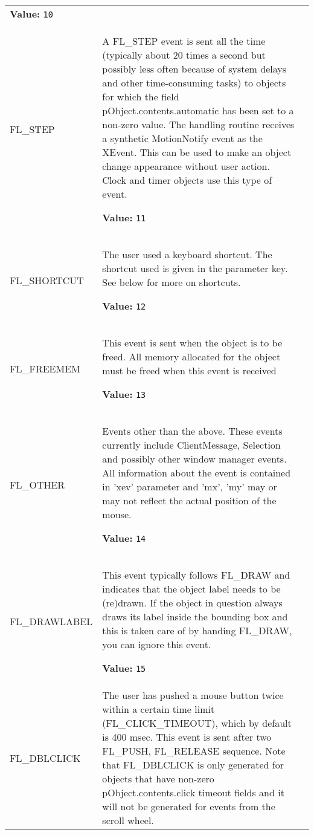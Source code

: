 \begin{longtable}{|p{\varnamewidth}|p{\vardescrwidth}|l}
\textbf{Value:} 
{\tt 10}&\\
\cline{1-2}
\raggedright F\-L\-\_\-S\-T\-E\-P\- & \raggedright A FL\_STEP event is sent all the time (typically about 20 times a
          second but possibly less often because of system delays and other
          time-consuming tasks) to objects for which the field 
          pObject.contents.automatic has been set to a non-zero value. The 
          handling routine receives a synthetic MotionNotify event as the 
          XEvent. This can be used to make an object change appearance 
          without user action. Clock and timer objects use this type of 
          event.

\textbf{Value:} 
{\tt 11}&\\
\cline{1-2}
\raggedright F\-L\-\_\-S\-H\-O\-R\-T\-C\-U\-T\- & \raggedright The user used a keyboard shortcut. The shortcut used is given in 
          the parameter key. See below for more on shortcuts.

\textbf{Value:} 
{\tt 12}&\\
\cline{1-2}
\raggedright F\-L\-\_\-F\-R\-E\-E\-M\-E\-M\- & \raggedright This event is sent when the object is to be freed. All memory 
          allocated for the object must be freed when this event is 
          received

\textbf{Value:} 
{\tt 13}&\\
\cline{1-2}
\raggedright F\-L\-\_\-O\-T\-H\-E\-R\- & \raggedright Events other than the above. These events currently include 
          ClientMessage, Selection and possibly other window manager 
          events. All information about the event is contained in 'xev' 
          parameter and 'mx', 'my' may or may not reflect the actual 
          position of the mouse.

\textbf{Value:} 
{\tt 14}&\\
\cline{1-2}
\raggedright F\-L\-\_\-D\-R\-A\-W\-L\-A\-B\-E\-L\- & \raggedright This event typically follows FL\_DRAW and indicates that the 
          object label needs to be (re)drawn. If the object in question 
          always draws its label inside the bounding box and this is taken 
          care of by handing FL\_DRAW, you can ignore this event.

\textbf{Value:} 
{\tt 15}&\\
\cline{1-2}
\raggedright F\-L\-\_\-D\-B\-L\-C\-L\-I\-C\-K\- & \raggedright The user has pushed a mouse button twice within a certain time 
          limit (FL\_CLICK\_TIMEOUT), which by default is 400 msec. This 
          event is sent after two FL\_PUSH, FL\_RELEASE sequence. Note that
          FL\_DBLCLICK is only generated for objects that have non-zero 
          pObject.contents.click timeout fields and it will not be 
          generated for events from the scroll wheel.


\end{longtable}
